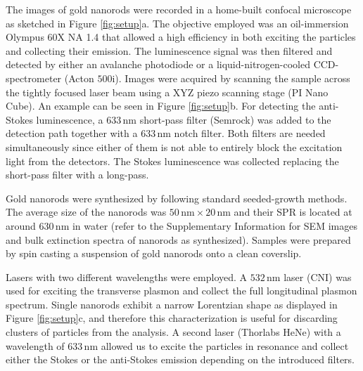 \documentclass[journal=nalefd,manuscript=letter]{achemso}
\newcommand{\nm}{\ensuremath{\,\textrm{nm}}}
\begin{document}
The images of gold nanorods were recorded in a home-built confocal microscope as
sketched in Figure \ref{fig:setup}a. The objective employed was an oil-immersion
Olympus 60X NA 1.4 that allowed a high efficiency in both exciting the particles
and collecting their emission. The luminescence signal was then filtered and
detected by either an avalanche photodiode or a liquid-nitrogen-cooled
CCD-spectrometer (Acton $500\textrm{i}$). Images were acquired by scanning the
sample across the tightly focused laser beam using a XYZ piezo scanning stage
(PI Nano Cube). An example can be seen in Figure \ref{fig:setup}b. For detecting
the anti-Stokes luminescence, a $633\nm$ short-pass filter (Semrock) was added
to the detection path together with a $633\nm$ notch filter. Both filters are
needed simultaneously since either of them is not able to entirely block the
excitation light from the detectors. The Stokes luminescence was collected
replacing the short-pass filter with a long-pass.

Gold nanorods were synthesized by following standard seeded-growth
methods\cite{Nikoobakht2003}. The average size of the nanorods was $50\nm\times
20\nm$ and their SPR is located at around $630\nm$ in water (refer to the
Supplementary Information for SEM images and bulk extinction spectra of nanorods
as synthesized). Samples were prepared by spin casting a suspension of gold
nanorods onto a clean coverslip. 

Lasers with two different wavelengths were employed. A $532\nm$ laser (CNI) was
used for exciting the transverse plasmon and collect the full longitudinal
plasmon spectrum. Single nanorods exhibit a narrow Lorentzian shape as
displayed in Figure \ref{fig:setup}c, and therefore this characterization is
useful for discarding clusters of particles from the analysis. A second laser
(Thorlabs HeNe) with a wavelength of $633\nm$ allowed us to excite the particles
in resonance and collect either the Stokes or the anti-Stokes emission depending
on the introduced filters.
\end{document}
